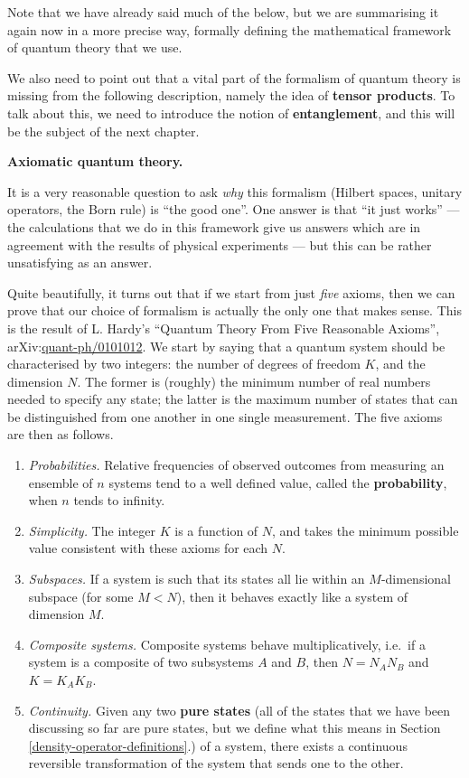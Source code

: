 \documentclass[fleqn,a4paper]{article}
\providecommand{\tightlist}{\setlength{\itemsep}{0pt}\setlength{\parskip}{0pt}}
\newenvironment{technical}[1]{\textbf{#1.}\par\vspace{.5\baselineskip}\everypar{\setlength{\parindent}{1.5em}}}{}
\theoremstyle{definition}
\theoremstyle{definition}
\theoremstyle{definition}
\theoremstyle{definition}
\theoremstyle{remark}
\begin{document}
Note that we have already said much of the below, but we are summarising it again now in a more precise way, formally defining the mathematical framework of quantum theory that we use.

We also need to point out that a vital part of the formalism of quantum theory is missing from the following description, namely the idea of \textbf{tensor products}.
To talk about this, we need to introduce the notion of \textbf{entanglement}, and this will be the subject of the next chapter.

\begin{technical}{Axiomatic quantum theory}
It is a very reasonable question to ask \emph{why} this formalism (Hilbert spaces, unitary operators, the Born rule) is ``the good one''.
One answer is that ``it just works'' --- the calculations that we do in this framework give us answers which are in agreement with the results of physical experiments --- but this can be rather unsatisfying as an answer.

Quite beautifully, it turns out that if we start from just \emph{five} axioms, then we can prove that our choice of formalism is actually the only one that makes sense.
This is the result of L. Hardy's ``Quantum Theory From Five Reasonable Axioms'', arXiv:\href{https://arxiv.org/abs/quant-ph/0101012}{quant-ph/0101012}.
We start by saying that a quantum system should be characterised by two integers: the number of degrees of freedom \(K\), and the dimension \(N\).
The former is (roughly) the minimum number of real numbers needed to specify any state; the latter is the maximum number of states that can be distinguished from one another in one single measurement.
The five axioms are then as follows.

\begin{enumerate}
\def\labelenumi{\arabic{enumi}.}
\tightlist
\item
  \emph{Probabilities.} Relative frequencies of observed outcomes from measuring an ensemble of \(n\) systems tend to a well defined value, called the \textbf{probability}, when \(n\) tends to infinity.
\item
  \emph{Simplicity.} The integer \(K\) is a function of \(N\), and takes the minimum possible value consistent with these axioms for each \(N\).
\item
  \emph{Subspaces.} If a system is such that its states all lie within an \(M\)-dimensional subspace (for some \(M<N\)), then it behaves exactly like a system of dimension \(M\).
\item
  \emph{Composite systems.} Composite systems behave multiplicatively, i.e.~if a system is a composite of two subsystems \(A\) and \(B\), then \(N=N_AN_B\) and \(K=K_AK_B\).
\item
  \emph{Continuity.} Given any two \textbf{pure states} (all of the states that we have been discussing so far are pure states, but we define what this means in Section \ref{density-operator-definitions}.) of a system, there exists a continuous reversible transformation of the system that sends one to the other.
\end{enumerate}


\end{technical}
\end{document}
